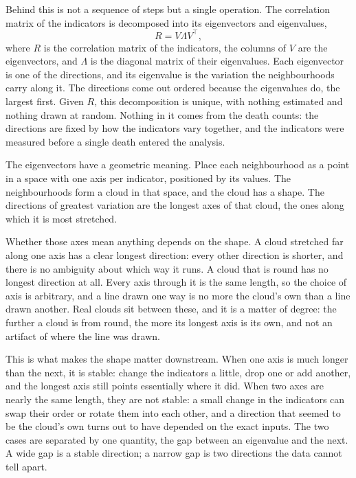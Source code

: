 Behind this is not a sequence of steps but a single operation. The correlation matrix of the indicators is decomposed into its eigenvectors and eigenvalues,
%
\begin{equation}\label{eq_eigen}
R = V \Lambda V^{\top},
\end{equation}
%
where $R$ is the correlation matrix of the indicators, the columns of $V$ are the eigenvectors, and $\Lambda$ is the diagonal matrix of their eigenvalues. Each eigenvector is one of the directions, and its eigenvalue is the variation the neighbourhoods carry along it. The directions come out ordered because the eigenvalues do, the largest first. Given $R$, this decomposition is unique, with nothing estimated and nothing drawn at random. Nothing in it comes from the death counts: the directions are fixed by how the indicators vary together, and the indicators were measured before a single death entered the analysis.

The eigenvectors have a geometric meaning. Place each neighbourhood as a point in a space with one axis per indicator, positioned by its values. The neighbourhoods form a cloud in that space, and the cloud has a shape. The directions of greatest variation are the longest axes of that cloud, the ones along which it is most stretched.

Whether those axes mean anything depends on the shape. A cloud stretched far along one axis has a clear longest direction: every other direction is shorter, and there is no ambiguity about which way it runs. A cloud that is round has no longest direction at all. Every axis through it is the same length, so the choice of axis is arbitrary, and a line drawn one way is no more the cloud's own than a line drawn another. Real clouds sit between these, and it is a matter of degree: the further a cloud is from round, the more its longest axis is its own, and not an artifact of where the line was drawn.

This is what makes the shape matter downstream. When one axis is much longer than the next, it is stable: change the indicators a little, drop one or add another, and the longest axis still points essentially where it did. When two axes are nearly the same length, they are not stable: a small change in the indicators can swap their order or rotate them into each other, and a direction that seemed to be the cloud's own turns out to have depended on the exact inputs. The two cases are separated by one quantity, the gap between an eigenvalue and the next. A wide gap is a stable direction; a narrow gap is two directions the data cannot tell apart.


